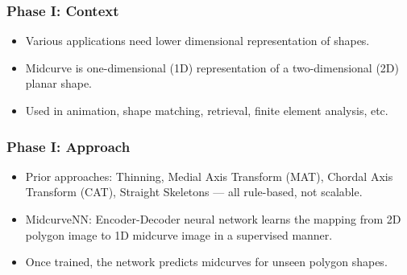 
\begin{frame}[fragile]\frametitle{Phase I: Context}
	\begin{itemize}
	\item Various applications need lower dimensional representation of shapes.
	\item Midcurve is one-dimensional (1D) representation of a two-dimensional (2D) planar shape.
	\item Used in animation, shape matching, retrieval, finite element analysis, etc.
	\end{itemize}
\end{frame}

\begin{frame}[fragile]\frametitle{Phase I: Approach}
	\begin{itemize}
	\item Prior approaches: Thinning, Medial Axis Transform (MAT), Chordal Axis Transform (CAT), Straight Skeletons --- all rule-based, not scalable.
	\item MidcurveNN: Encoder-Decoder neural network learns the mapping from 2D polygon image to 1D midcurve image in a supervised manner.
	\item Once trained, the network predicts midcurves for unseen polygon shapes.
	\end{itemize}
\end{frame}


